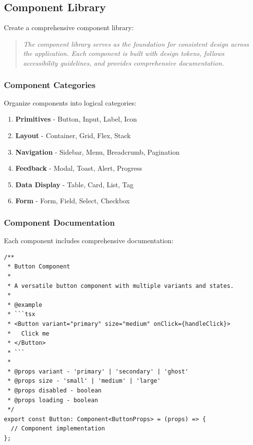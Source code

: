 \documentclass[11pt]{article}
\begin{document}
\subsection{Component Library}

Create a comprehensive component library:

\begin{quote}
\emph{The component library serves as the foundation for consistent design across the application. Each component is built with design tokens, follows accessibility guidelines, and provides comprehensive documentation.}
\end{quote}

\subsubsection{Component Categories}

Organize components into logical categories:

\begin{enumerate}
\item \textbf{Primitives} - Button, Input, Label, Icon
\item \textbf{Layout} - Container, Grid, Flex, Stack
\item \textbf{Navigation} - Sidebar, Menu, Breadcrumb, Pagination
\item \textbf{Feedback} - Modal, Toast, Alert, Progress
\item \textbf{Data Display} - Table, Card, List, Tag
\item \textbf{Form} - Form, Field, Select, Checkbox
\end{enumerate}

\subsubsection{Component Documentation}

Each component includes comprehensive documentation:

\begin{lstlisting}[style=typescript]
/**
 * Button Component
 * 
 * A versatile button component with multiple variants and states.
 * 
 * @example
 * ```tsx
 * <Button variant="primary" size="medium" onClick={handleClick}>
 *   Click me
 * </Button>
 * ```
 * 
 * @props variant - 'primary' | 'secondary' | 'ghost'
 * @props size - 'small' | 'medium' | 'large'
 * @props disabled - boolean
 * @props loading - boolean
 */
export const Button: Component<ButtonProps> = (props) => {
  // Component implementation
};
\end{lstlisting}
\end{document}
